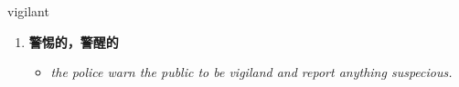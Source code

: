 
\begin{frame}
{\huge vigilant}
\begin{center}
\begin{enumerate}\Large
  \item \textbf{警惕的，警醒的}
  \begin{itemize}
    \item \em{\Large{the police warn the public to be vigiland and report anything suspecious.}}
  \end{itemize}
\end{enumerate}
\end{center}
\end{frame}
